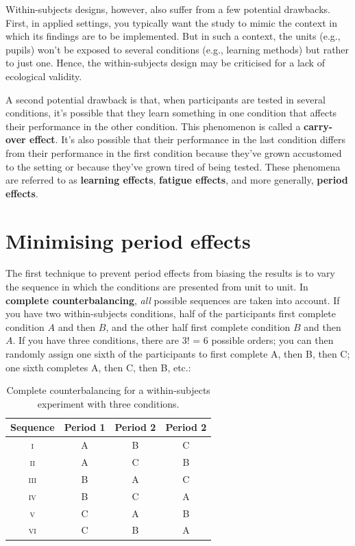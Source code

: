 \documentclass[a4paper]{tufte-book}\usepackage[]{graphicx}\usepackage[]{xcolor}
\newcommand{\term}[1]{\textbf{#1}}
\begin{document}
Within-subjects designs, however, also suffer from a few potential drawbacks.
First, in applied settings, you typically want the study 
to mimic the context in which its findings are to be implemented.
But in such a context, the units (e.g., pupils) won't be exposed to several 
conditions (e.g., learning methods) but rather to just one.
Hence, the within-subjects design may be criticised for a lack of ecological validity.

A second potential drawback is that,
when participants are tested in several conditions,
it's possible that they learn something in one condition
that affects their performance in the other condition.
This phenomenon is called a \term{carry-over effect}.
It's also possible that their performance in the last condition differs
from their performance in the first condition because they've grown
accustomed to the setting or because they've grown tired of being tested.
These phenomena are referred to as
\term{learning effects}, \term{fatigue effects},
and more generally, \term{period effects}.

\section{Minimising period effects}
The first technique to prevent period effects 
from biasing the results is to vary 
the sequence in which the conditions are presented from unit to unit.
In \term{complete counterbalancing}, \emph{all} possible sequences are 
taken into account. If you have two within-subjects conditions,
half of the participants first complete condition $A$ and then $B$,
and the other half first complete condition $B$ and then $A$.
If you have three conditions, there are 3! = 6 possible orders;
you can then randomly assign one sixth of the participants to 
first complete A, then B, then C;
one sixth completes A, then C, then B, etc.:
 
\begin{table}[h]
\centering
\caption{Complete counterbalancing for a within-subjects experiment with three conditions.}
\label{tab:counter}
\begin{tabular}{cccc}
\toprule
Sequence & Period 1 & Period 2 & Period 2 \\
\midrule
\textsc{i}  & A & B & C \\
\textsc{ii} & A & C & B \\
\textsc{iii}&  B & A & C \\
\textsc{iv} & B & C & A \\
\textsc{v}  & C & A & B \\
\textsc{vi} & C & B & A \\
\bottomrule
\end{tabular}
\end{table}
\end{document}
